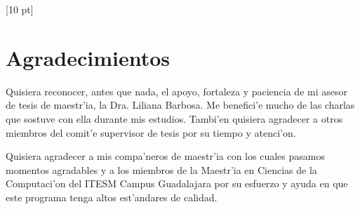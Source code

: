 \titleformat{\chapter}{\Huge\bfseries}{\thechapter}{0 pt}{\rule{340 pt}{3 pt}\\}
\titlespacing{\chapter}{100 pt}{-25 pt}{40 pt}[10 pt]	
\pagestyle{fancy}
\fancyhead[RO,RE]{\thepage}
\fancyfoot[CO,CE]{}

\chapter*{Agradecimientos}

\normalsize
\noindent Quisiera reconocer, antes que nada, el apoyo, fortaleza y paciencia de mi asesor de tesis de maestr'ia, la Dra. Liliana Barbosa.  Me benefici'e mucho de las charlas que sostuve con ella durante mis estudios. Tambi'en quisiera agradecer a otros miembros del comit'e supervisor de tesis por su tiempo y atenci'on.

Quisiera agradecer a mis compa'neros de maestr'ia con los cuales pasamos momentos agradables y a los miembros de la Maestr'ia en Ciencias de la Computaci'on del ITESM Campus Guadalajara por su esfuerzo y ayuda en que este programa tenga altos est'andares de calidad.
\clearpage